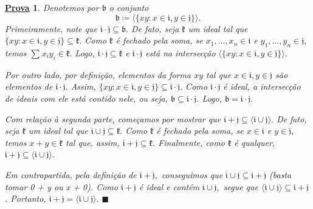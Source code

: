 \documentclass{article}
\newtheorem*{proof*}{\underline{Prova}}
\renewcommand\qedsymbol{$\blacksquare$}
\begin{document}
\begin{proof*}
  Denotemos por \(\mathfrak{b}\) o conjunto 
  \[
    \mathfrak{b}\coloneqq \langle \{xy:x\in \mathfrak{i}, y\in \mathfrak{j}\} \rangle.
  \]
Primeiramente, note que \(\mathfrak{i}\cdot \mathfrak{j}\subseteq{\mathfrak{b}}.\) De fato, seja \(\mathfrak{k}\) um ideal tal que \(\{xy:x\in \mathfrak{i}, y\in \mathfrak{j}\}\subseteq{\mathfrak{k}}.\)
Como \(\mathfrak{k}\) é fechado pela soma, se \(x_{1}, \dotsc, x_{n}\in \mathfrak{i}\) e \(y_{1},\dotsc,y_{n}\in \mathfrak{j},\) temos  
 \(\sum\limits_{}^{}x_{i}y_{i}\in \mathfrak{k}.\) Logo, \(\mathfrak{i}\cdot \mathfrak{j}\subseteq{\mathfrak{k}}\) e \(\mathfrak{i}\cdot \mathfrak{j}\) está
 na intersecção \(\langle \{xy: x\in \mathfrak{i}, y\in \mathfrak{j}\} \rangle.\)

 Por outro lado, por definição, elementos da forma \(xy\) tal que \(x\in \mathfrak{i}, y\in \mathfrak{j}\) são elementos
de \(\mathfrak{i}\cdot \mathfrak{j}.\) Assim, \(\{xy:x\in \mathfrak{i}, y\in \mathfrak{j}\}\subseteq{\mathfrak{i}\cdot \mathfrak{j}}.\) Como
 \(\mathfrak{i}\cdot \mathfrak{j}\) é ideal, a intersecção de ideais com ele está contido nele, ou seja, \(\mathfrak{b}\subseteq{\mathfrak{i}\cdot \mathfrak{j}}\).
 Logo, \(\mathfrak{b} = \mathfrak{i}\cdot \mathfrak{j}.\)

 Com relação à segunda parte, começamos por mostrar que \(\mathfrak{i}+\mathfrak{j}\subseteq{\langle \mathfrak{i}\cup \mathfrak{j} \rangle}.\) De fato,
seja \(\mathfrak{k}\) um ideal tal que \(\mathfrak{i}\cup \mathfrak{j}\subseteq{\mathfrak{k}}.\) Como \(\mathfrak{k}\) é fechado pela soma,
se \(x\in \mathfrak{i}\) e \(y\in \mathfrak{j},\) temos \(x+y\in \mathfrak{k}\) tal que, assim, \(\mathfrak{i} + \mathfrak{j}\subseteq{\mathfrak{k}}\).
Finalmente, como \(\mathfrak{k}\) é qualquer, \(\mathfrak{i}+\mathfrak{j}\subseteq{\langle \mathfrak{i}\cup \mathfrak{j} \rangle}.\)

  Em contrapartida, pela definição de \(\mathfrak{i} + \mathfrak{j},\) conseguimos 
que \(\mathfrak{i}\cup \mathfrak{j}\subseteq{\mathfrak{i}+\mathfrak{j}}\) (basta tomar 0 + y ou x + 0).
Como \(\mathfrak{i} + \mathfrak{j}\) é ideal e contém \(\mathfrak{i}\cup \mathfrak{j},\) segue que \(\langle \mathfrak{i}\cup \mathfrak{j} \rangle\subseteq{\mathfrak{i}+\mathfrak{j}}\).
Portanto, \(\mathfrak{i}+\mathfrak{j} = \langle \mathfrak{i}\cup \mathfrak{j} \rangle.\) \qedsymbol
\end{proof*}
\end{document}
